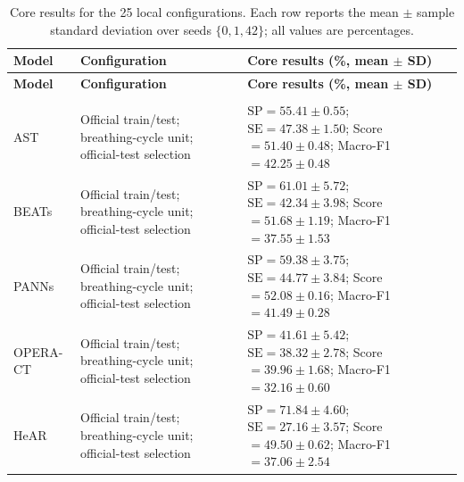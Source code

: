 \documentclass[10pt]{article}
\newcommand{\metric}[2]{\ensuremath{#1\mathbin{\pm}#2}}
\begin{document}
\begin{landscape}
\setlength{\tabcolsep}{3pt}
\renewcommand{\arraystretch}{1.18}
\scriptsize

\begin{longtable}{@{}P{2.2cm}P{4.6cm}P{19.4cm}@{}}
\caption{Core results for the 25 local configurations. Each row reports the
mean $\pm$ sample standard deviation over seeds $\{0,1,42\}$; all values are
percentages.}
\label{tab:core_local_3seed}\\
\toprule
\textbf{Model} &
\textbf{Configuration} &
\textbf{Core results (\%, mean $\pm$ SD)}\\
\midrule
\endfirsthead

\toprule
\textbf{Model} &
\textbf{Configuration} &
\textbf{Core results (\%, mean $\pm$ SD)}\\
\midrule
\endhead

\bottomrule
\endfoot

\\
\addlinespace[2pt]
AST &
Official train/test; breathing-cycle unit; official-test selection &
$\mathrm{SP}=\metric{55.41}{0.55}$; $\mathrm{SE}=\metric{47.38}{1.50}$;
Score $=\metric{51.40}{0.48}$; Macro-F1 $=\metric{42.25}{0.48}$\\
BEATs &
Official train/test; breathing-cycle unit; official-test selection &
$\mathrm{SP}=\metric{61.01}{5.72}$; $\mathrm{SE}=\metric{42.34}{3.98}$;
Score $=\metric{51.68}{1.19}$; Macro-F1 $=\metric{37.55}{1.53}$\\
PANNs &
Official train/test; breathing-cycle unit; official-test selection &
$\mathrm{SP}=\metric{59.38}{3.75}$; $\mathrm{SE}=\metric{44.77}{3.84}$;
Score $=\metric{52.08}{0.16}$; Macro-F1 $=\metric{41.49}{0.28}$\\
OPERA-CT &
Official train/test; breathing-cycle unit; official-test selection &
$\mathrm{SP}=\metric{41.61}{5.42}$; $\mathrm{SE}=\metric{38.32}{2.78}$;
Score $=\metric{39.96}{1.68}$; Macro-F1 $=\metric{32.16}{0.60}$\\
HeAR &
Official train/test; breathing-cycle unit; official-test selection &
$\mathrm{SP}=\metric{71.84}{4.60}$; $\mathrm{SE}=\metric{27.16}{3.57}$;
Score $=\metric{49.50}{0.62}$; Macro-F1 $=\metric{37.06}{2.54}$\\


\end{longtable}
\end{landscape}
\end{document}
